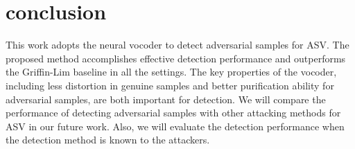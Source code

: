 \section{conclusion}
\label{sec:conclusion}
This work adopts the neural vocoder to detect adversarial samples for ASV.
The proposed method accomplishes effective detection performance and outperforms the Griffin-Lim baseline in all the settings.
The key properties of the vocoder, including less distortion in genuine samples and better purification ability for adversarial samples, are both important for detection.
We will compare the performance of detecting adversarial samples with other attacking methods for ASV in our future work.
Also, we will evaluate the detection performance when the detection method is known to the attackers.
